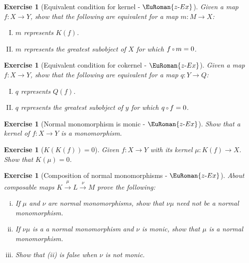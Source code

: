 \documentclass [12pt,oneside]{book}%
\theoremstyle{captionstyle}  %
\newtheorem{exercise}[theorem]{Exercise}
\newenvironment{thmlist}{		%
	\begin{enumerate}[(i)]}{
	\end{enumerate}
}
\newenvironment{tfae}{		%
	\begin{enumerate}[(I)]}{
	\end{enumerate}
}
\newenvironment{exercises}{%
	\def\FrameCommand{{\color{Maroon}\vrule width 0pt}\hspace{0pt}\fboxsep=\FrameSep}%
	\MakeFramed{\hsize=0.95\linewidth\advance\hsize-\width\FrameRestore%
		\bigskip
		\textbf{Exercises}\vspace{-2ex}\footnotesize{
		}}
}
{\endMakeFramed}
\newcommand{\hy}{\text{-}}													%
\newcommand{\XRA}[1]{\xrightarrow{\ #1\ }}
\newcommand{\from}{\colon}				%
\newcommand{\Comp}{\raisebox{0.1ex}{\ensuremath{\,\scriptstyle{\circ}}\,}}
\newcommand{\ZeroObject}{0}                           %
\newcommand{\ZeroMap}{0}                                %
\newcommand{\Ker}[1]{\textit{K}(#1)}		     	%
\newcommand{\CoKer}[1]{\textit{Q}(#1)}               %
\newcommand{\ZExactTag}{ - {\color{Cerulean} $\EuRoman{z\hy Ex}$}}
\begin{document}
\begin{exercises}
\begin{exercise}[Equivalent condition for kernel\ZExactTag]
    \label{exe:Kernel-EquivalentCondn}
    Given a map $f\from X\to Y$, show that the following are equivalent for a map $m\from M\to X$:
    \begin{tfae}
        \item $m$ represents $\Ker{f}$.
        \item $m$ represents the greatest subobject of $X$ for which $f\Comp m=\ZeroMap$.
    \end{tfae}
\end{exercise}

\begin{exercise}[Equivalent condition for cokernel\ZExactTag]
    \label{exe:CoKernel-EquivalentCondn}
    Given a map $f\from X\to Y$, show that the following are equivalent for a map $q\from Y\to Q$:
    \begin{tfae}
        \item $q$ represents $\CoKer{f}$.
        \item $q$ represents the greatest subobject of $y$ for which $q\Comp f=\ZeroMap$.
    \end{tfae}
\end{exercise}

\begin{exercise}[Normal monomorphism is monic\ZExactTag]
    \label{exe:Kernel->Monomorphism}
    Show that a kernel of $f\from X\to Y$ is a monomorphism. %
\end{exercise}


\begin{exercise}[$\Ker{\Ker{f}}=\ZeroObject$]
    \label{exe:Ker(Ker(f))=0}
    Given  $ f\from X\to Y$ with its kernel $ \mu\from \Ker{f}\to X$. Show that  $ \Ker{\mu}=0$.
\end{exercise}

\begin{exercise}[Composition of normal monomorphisms\ZExactTag]
    \label{exe:Kernels,Composition}%
    About composable maps  $ K \XRA{\mu} L \XRA{\nu} M$  prove the following: %
    \begin{thmlist}
        \item If $\mu$ and $\nu$ are normal monomorphisms, show that  $ \nu\mu$  need not be a normal monomorphism.
        \item If  $ \nu\mu$  is a a normal monomorphism and $\nu$ is monic, show that $\mu$ is a normal monomorphism.
        \item Show that (ii) is false when $\nu$ is not monic.
    \end{thmlist}
\end{exercise}


\end{exercises}
\end{document}
